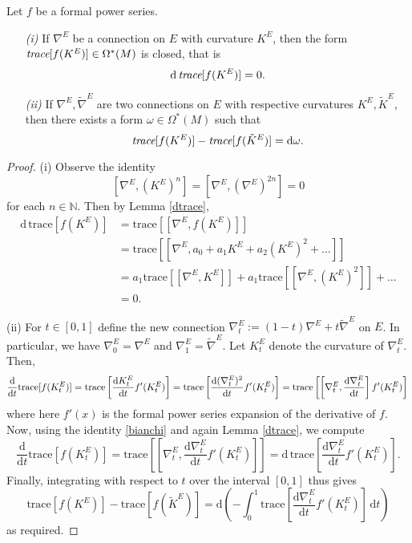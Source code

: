\documentclass[a4paper,openany]{scrbook}
\newcommand{\ud}{\mathrm{d}}
\begin{document}
\begin{thm}\label{cw}
Let $f$ be a formal power series.
\begin{itemize}
\item[\emph{(i)}] If $\nabla^E$ be a connection on $E$ with curvature $K^E$, then the form $\emph{trace}[f(K^E)]\in\Omega^*(M)$ is closed, that is
\begin{equation}
\ud\,\emph{trace}[f(K^E)]=0.
\end{equation}
\item[\emph{(ii)}] If $\nabla^E,\tilde{\nabla}^E$ are two connections on $E$ with respective curvatures $K^E,\tilde{K}^E$, then there exists a form $\omega\in\Omega^*(M)$ such that
\begin{equation}
\emph{trace}[f(K^E)]-\emph{trace}[f(\tilde{K}^E)]=\ud\omega.
\end{equation}
\end{itemize}
\end{thm}
\begin{proof}
\noindent (i) Observe the identity
\begin{equation}\label{bianchi}
[\nabla^E,(K^E)^n]=[\nabla^E,(\nabla^E)^{2n}]=0
\end{equation}
for each $n\in\mathbb{N}$. Then by Lemma \ref{dtrace},
\begin{align*}
\ud\,\text{trace}[f(K^E)]&=\text{trace}[[\nabla^E,f(K^E)]]\\
&=\text{trace}[[\nabla^E,a_0+a_1K^E+a_2(K^E)^2+\dots]]\\
&=a_1\text{trace}[[\nabla^E,K^E]]+a_1\text{trace}[[\nabla^E,(K^E)^2]]+\dots\\
&=0.
\end{align*}

\noindent (ii) For $t\in[0,1]$ define the new connection $\nabla_t^E:=(1-t)\nabla^E+t\tilde{\nabla}^E$ on $E$. In particular, we have $\nabla_0^E=\nabla^E$ and $\nabla_1^E=\tilde{\nabla}^E$. Let $K_t^E$ denote the curvature of $\nabla_t^E$. Then, 
\begin{equation*}
\frac{\ud}{\ud t}\text{trace}[f(K_t^E)]=\text{trace}\left[\frac{\ud K_t^E}{\ud t} f'(K_t^E)\right]=\text{trace}\left[\frac{\ud(\nabla_t^E)^2}{\ud t}f'(K_t^E)\right]=\text{trace}\left[\left[\nabla_t^E,\frac{\ud\nabla_t^E}{\ud t}\right]f'(K_t^E)\right]\\
\end{equation*}
where here $f'(x)$ is the formal power series expansion of the derivative of $f$. Now, using the identity \eqref{bianchi} and again Lemma \ref{dtrace}, we compute
\begin{equation*}
\frac{\ud}{\ud t}\text{trace}[f(K_t^E)]=\text{trace}\left[\left[\nabla_t^E,\frac{\ud\nabla_t^E}{\ud t}f'(K_t^E)\right]\right]=\ud\,\text{trace}\left[\frac{\ud\nabla_t^E}{\ud t}f'(K_t^E)\right].
\end{equation*}
Finally, integrating with respect to $t$ over the interval $[0,1]$ thus gives
\begin{equation*}
\text{trace}[f(K^E)]-\text{trace}[f(\tilde{K}^E)]=\ud\left(-\int_0^1\text{trace}\left[\frac{\ud\nabla_t^E}{\ud t}f'(K_t^E)\right]\,\ud t\right)
\end{equation*}
as required.
\end{proof}
\end{document}

